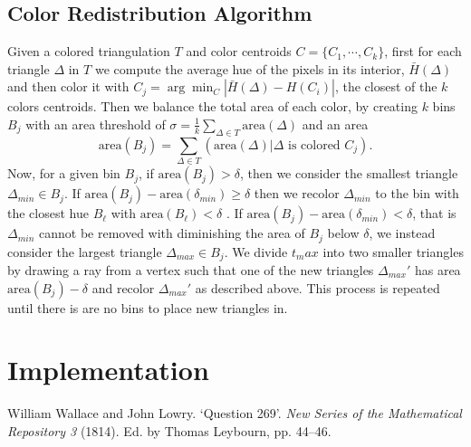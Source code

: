 \documentclass[a4paper,UKenglish]{lipics-v2016}
\begin{document}
\subsection{Color Redistribution Algorithm}
Given a colored triangulation $T$ and color centroids $C=\{C_1,\cdots, C_k \}$, first
for each triangle $\Delta$ in $T$ we compute the average hue of the pixels in its interior, $\bar{H}(\Delta)$ and then color it with $C_j = \arg \min_C |\bar{H}(\Delta)-H(C_i)|$, the closest of the $k$ colors centroids. Then we  balance the total area of each color, by creating $k$ bins $B_j$ with an area threshold of $\sigma=\frac{1}{k}\sum_{\Delta \in T}\text{area}(\Delta)$ and an area $$\text{area$(B_j)$} = \sum_{\Delta \in T} (\text{area}(\Delta) | \text{$\Delta$ is colored $C_j$}).$$ Now, for a given bin $B_j$, if $\text{area$(B_j)$} > \delta$, then we consider the smallest triangle $\Delta_{min} \in B_j$. If $\text{area$(B_j)$} - \text{area$(\delta_{min})$} \geq \delta$ then we recolor $\Delta_{min}$ to the bin with the closest hue $B_\ell$ with $\text{area$(B_\ell)$} < \delta$ . If $\text{area$(B_j)$} - \text{area$(\delta_{min})$} < \delta$, that is $\Delta_{min}$ cannot be removed with diminishing the area of $B_j$ below $\delta$, we instead consider the largest triangle $\Delta_{max}\in B_j$. We divide $t_max$ into two smaller triangles by drawing a ray from a vertex such that one of the new triangles $\Delta_{max}'$ has area $\text{area$(B_j)$} - \delta $ and recolor $\Delta_{max}'$ as described above. This process is repeated until there is are no bins to place new triangles in.
\section{Implementation}




%


\nocite{Simpson}

\begin{thebibliography}{50}
William Wallace and John Lowry. ‘Question 269’. \textit{New Series of the Mathematical Repository 3} (1814). Ed. by Thomas Leybourn, pp. 44–46.
\end{thebibliography}
\end{document}

